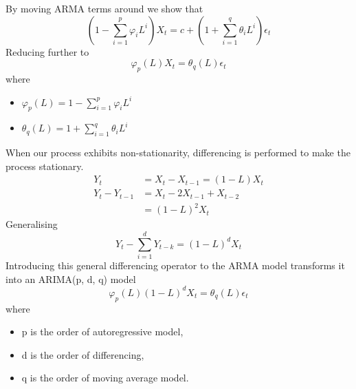 By moving ARMA terms around we show that 
\begin{equation}
    \left(1 - \sum\limits_{i=1}^{p} \varphi_i L^i\right) X_t = c + \left(1 + \sum\limits_{i=1}^{q} \theta_i L^i \right) \epsilon_{t}
\end{equation}
Reducing further to 
\begin{equation}
    \varphi_p(L)X_t = \theta_q(L)\epsilon_t
\end{equation}
where
\begin{itemize}[nosep]
    \item[] $ \varphi_p(L) = 1 - \sum\limits_{i=1}^{p} \varphi_i L^i $
    \item[]  $ \theta_q(L) = 1 + \sum\limits_{i=1}^{q} \theta_i L^i $
\end{itemize}
When our process exhibits non-stationarity, differencing is performed to make the process stationary.
\begin{equation}
    \begin{aligned}
        Y_t &= X_t - X_{t-1} = (1 - L)X_t \\
        Y_t - Y_{t-1} &= X_t - 2X_{t-1} + X_{t-2} \\
        &= (1 - L)^2 X_t
    \end{aligned}
\end{equation}
Generalising
\begin{equation}
    Y_t - \sum\limits_{i=1}^{d}Y_{t-k}  = (1 - L)^d X_t
\end{equation}
Introducing this general differencing operator to the ARMA model transforms it into an ARIMA(p, d, q) model
\begin{equation}
    \varphi_p(L)(1-L)^d X_t = \theta_q(L) \epsilon_t
\end{equation}
where 
\begin{itemize}[nosep]
    \item[] p is the order of autoregressive model,
    \item[] d is the order of differencing,
    \item[] q is the     order of moving average model.
\end{itemize}

